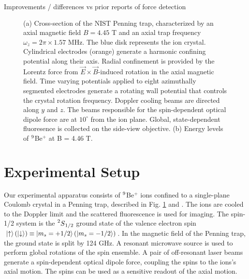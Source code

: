 \documentclass[aps,prl,twocolumn,groupedaddress,floatfix]{revtex4-1}
\begin{document}
Improvements / differences vs prior reports of force detection \citep{Biercuk2010a, Biercuk2011}
\begin{figure}[h]
  \hfill
  \hfill
  \caption{(a) Cross-section of the NIST Penning trap, characterized by an axial magnetic field $B = 4.45$ T and an axial trap frequency $\omega_z = 2\pi \times 1.57$ MHz. The blue disk represents the ion crystal. Cylindrical electrodes (orange) generate a harmonic confining potential along their axis. Radial confinement is provided by the Lorentz force from $\vec{E} \times \vec{B}$-induced rotation in the axial magnetic field. Time varying potentials applied to eight azimuthally segmented electrodes generate a rotating wall potential that controls the crystal rotation frequency. Doppler cooling beams are directed along $y$ and $z$. The beams responsible for the spin-dependent optical dipole force are at $10^{\circ} $ from the ion plane. Global, state-dependent fluoresence is collected on the side-view objective. (b) Energy levels of $\prescript{9}{}{}$Be$^{+}$ at B = 4.46 T.}\label{Fig 1}
\end{figure}
\section{Experimental Setup}
Our experimental apparatus consists of $\prescript{9}{}{}$Be$^{+}$ ions confined to a single-plane Coulomb crystal in a Penning trap, described in Fig. \ref{Fig 1} and \citep{Bohnet2015a}. The ions are cooled to the Doppler limit and the scattered fluorescence is used for imaging. The spin-1/2 system is the $\prescript{2}{}{S}_{1/2}$ ground state of the valence electron spin $\ket{\uparrow} (\ket{\downarrow}) \equiv \ket{m_{s}=+1/2} (\ket{m_{s}=-1/2}) $. In the magnetic field of the Penning trap, the ground state is split by 124 GHz. A resonant microwave source is used to perform global rotations of the spin ensemble. A pair of off-resonant laser beams generate a spin-dependent optical dipole force, coupling the spins to the ions's axial motion. The spins can be used as a sensitive readout of the axial motion.
\end{document}
